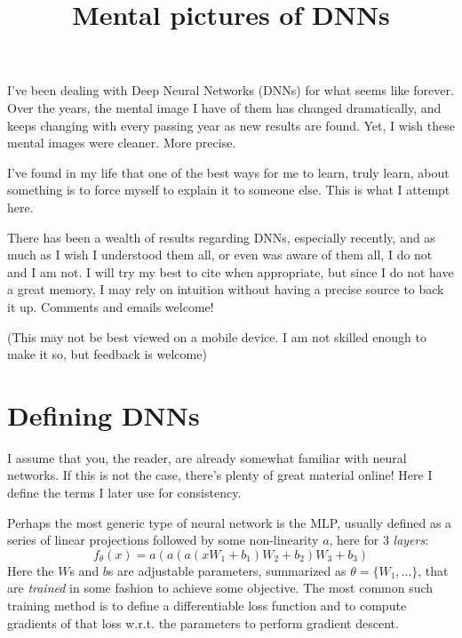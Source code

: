 \title{Mental pictures of DNNs}


I've been dealing with Deep Neural Networks (DNNs) for what seems like forever. Over the years, the mental image I have of them has changed dramatically, and keeps changing with every passing year as new results are found. Yet, I wish these mental images were cleaner. More precise.

I've found in my life that one of the best ways for me to learn, truly learn, about something is to force myself to explain it to someone else. This is what I attempt here.

There has been a wealth of results regarding DNNs, especially recently, and as much as I wish I understood them all, or even was aware of them all, I do not and I am not. I will try my best to cite when appropriate, but since I do not have a great memory, I may rely on intuition without having a precise source to back it up. Comments and emails welcome!

(This may not be best viewed on a mobile device. I am not skilled enough to make it so, but feedback is welcome)

\tableofcontents
\donumbersections

\section{Defining DNNs}


I assume that you, the reader, are already somewhat familiar with neural networks. If this is not the case, there's plenty of great material online! Here I define the terms I later use for consistency. 

Perhaps the most generic type of neural network is the MLP, usually defined as a series of linear projections followed by some non-linearity $a$, here for 3 \emph{layers}:
$$f_\theta(x) = a(a(a(xW_1 + b_1)W_2 + b_2)W_3 + b_3)$$
Here the $W$s and $b$s are adjustable parameters, summarized as $\theta = \{W_1,...\}$, that are \emph{trained} in some fashion to achieve some objective. The most common such training method is to define a differentiable loss function and to compute gradients of that loss w.r.t. the parameters to perform gradient descent.

